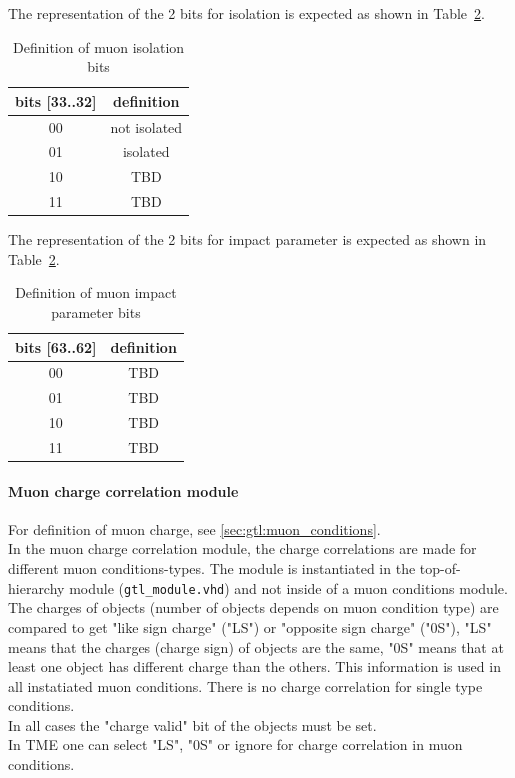 The representation of the 2 bits for isolation is expected as shown in Table~\ref{tab:gtl:muon_iso_bits}.\\
 
\begin{table}[ht]
\caption{Definition of muon isolation bits}
\vspace{5mm}
\centering
\begin{tabular}{|c|c|}\hline
bits [33..32] & definition \\\hline\hline
00 & not isolated \\
01 & isolated \\
10 & TBD \\
11 & TBD \\\hline
\end{tabular}
\label{tab:gtl:muon_iso_bits}
\end{table}

The representation of the 2 bits for impact parameter is expected as shown in Table~\ref{tab:gtl:muon_iso_bits}.\\
 
\begin{table}[ht]
\caption{Definition of muon impact parameter bits}
\vspace{5mm}
\centering
\begin{tabular}{|c|c|}\hline
bits [63..62] & definition \\\hline\hline
00 & TBD \\
01 & TBD \\
10 & TBD \\
11 & TBD \\\hline
\end{tabular}
\label{tab:gtl:muon_iso_bits}
\end{table}

\clearpage

\paragraph{Muon charge correlation module}\label{sec:gtl:muon_charge_correlation_module}

For definition of muon charge, see \ref{sec:gtl:muon_conditions}.\\
In the muon charge correlation module, the charge correlations are made for different muon conditions-types. The module is instantiated in the top-of-hierarchy module (\texttt{gtl\_module.vhd})
and not inside of a muon conditions module. 
The charges of objects (number of objects depends on muon condition type) are compared to get "like sign charge" ("LS") or "opposite sign charge" ("0S"), "LS" means that the charges (charge sign)
of objects are the same, "0S" means that at least one object has different charge than the others. This information is used in all instatiated muon conditions.
There is no charge correlation for single type conditions.\\
In all cases the "charge valid" bit of the objects must be set.\\
In TME one can select "LS", "0S" or ignore for charge correlation in muon conditions.\\

